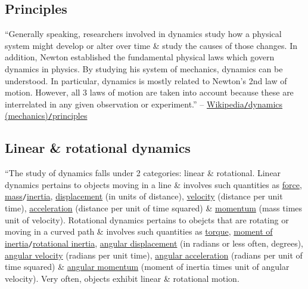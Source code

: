 \documentclass{article}
\begin{document}
\subsection{Principles}
``Generally speaking, researchers involved in dynamics study how a physical system might develop or alter over time \& study the causes of those changes. In addition, Newton established the fundamental physical laws which govern dynamics in physics. By studying his system of mechanics, dynamics can be understood. In particular, dynamics is mostly related to Newton's 2nd law of motion. However, all 3 laws of motion are taken into account because these are interrelated in any given observation or experiment.'' -- \href{https://en.wikipedia.org/wiki/Dynamics_(mechanics)#Principles}{Wikipedia\texttt{/}dynamics (mechanics)\texttt{/}principles}

\subsection{Linear \& rotational dynamics}
``The study of dynamics falls under 2 categories: linear \& rotational. Linear dynamics pertains to objects moving in a line \& involves such quantities as \href{https://en.wikipedia.org/wiki/Force}{force}, \href{https://en.wikipedia.org/wiki/Mass}{mass}\texttt{/}\href{https://en.wikipedia.org/wiki/Inertia#Mass_and_inertia}{inertia}, \href{https://en.wikipedia.org/wiki/Displacement_(vector)}{displacement} (in units of distance), \href{https://en.wikipedia.org/wiki/Velocity}{velocity} (distance per unit time), \href{https://en.wikipedia.org/wiki/Acceleration}{acceleration} (distance per unit of time squared) \& \href{https://en.wikipedia.org/wiki/Momentum}{momentum} (mass times unit of velocity). Rotational dynamics pertains to obejcts that are rotating or moving in a curved path \& involves such quantities as \href{https://en.wikipedia.org/wiki/Torque}{torque}, \href{https://en.wikipedia.org/wiki/Moment_of_inertia}{moment of inertia}\texttt{/}\href{https://en.wikipedia.org/wiki/Rotational_inertia}{rotational inertia}, \href{https://en.wikipedia.org/wiki/Angular_displacement}{angular displacement} (in radians or less often, degrees), \href{https://en.wikipedia.org/wiki/Angular_velocity}{angular velocity} (radians per unit time), \href{https://en.wikipedia.org/wiki/Angular_acceleration}{angular acceleration} (radians per unit of time squared) \& \href{https://en.wikipedia.org/wiki/Angular_momentum}{angular momentum} (moment of inertia times unit of angular velocity). Very often, objects exhibit linear \& rotational motion.
\end{document}
